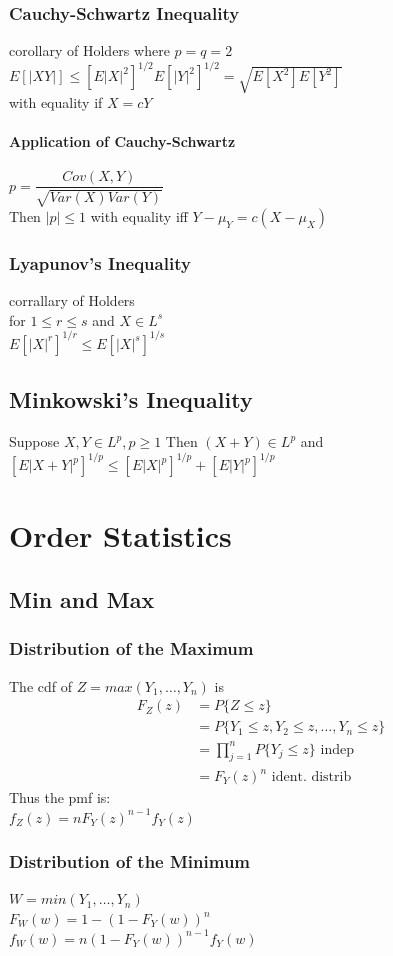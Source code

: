 \documentclass[openany]{book}
\begin{document}
\begin{flushleft}
\subsection{Cauchy-Schwartz Inequality}
corollary of Holders where $p=q=2$\\
$E[|XY|]\leq [E|X|^2]^{1/2}E[|Y|^2]^{1/2}=\sqrt{E[X^2]E[Y^2]}$\\
with equality if $X=cY$
\subsubsection{Application of Cauchy-Schwartz}
$p=\dfrac{Cov(X,Y)}{\sqrt{Var(X)Var(Y)}}$\\
Then $|p|\leq 1$ with equality iff $Y-\mu_Y=c(X-\mu_X)$
\subsection{Lyapunov's Inequality}
corrallary of Holders\\
for $1\leq r\leq s$ and $X\in L^s$\\
$E[|X|^r]^{1/r}\leq E[|X|^s]^{1/s}$
\section{Minkowski's Inequality}
Suppose $X,Y \in L^p, p\geq 1$ Then $(X+Y)\in L^p$ and\\
$[E|X+Y|^p]^{1/p}\leq [E|X|^p]^{1/p}+[E|Y|^p]^{1/p}$
\chapter{Order Statistics}
\section{Min and Max}
\subsection{Distribution of the Maximum}
The cdf of $Z=max(Y_1,\dots,Y_n)$ is\\
\begin{align*}
F_Z(z)&= P\{Z\leq z \}\\
&=P\{Y_1\leq z, Y_2 \leq z,\dots, Y_n \leq z \}\\
&=\prod_{j=1}^{n}P\{Y_j\leq z \} \text{ indep}\\
&=F_Y(z)^n \text{ ident. distrib}
\end{align*}
Thus the pmf is:\\
$f_Z(z)=nF_Y(z)^{n-1}f_Y(z)$
\subsection{Distribution of the Minimum}
$W=min(Y_1,\dots,Y_n)$\\
$F_W(w)=1-(1-F_Y(w))^n$\\
$f_W(w)=n(1-F_Y(w))^{n-1}f_Y(w)$

\end{flushleft}
\end{document}
